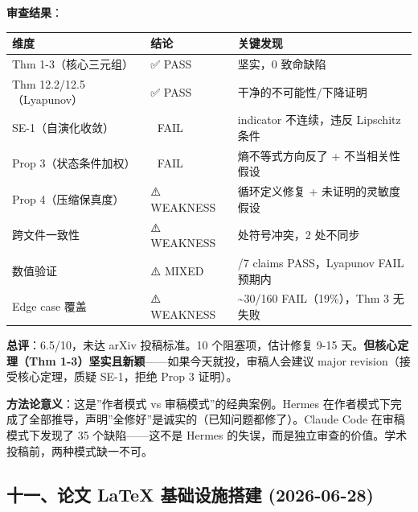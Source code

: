 \documentclass[
  12pt,
]{ctexart}
\begin{document}
\textbf{审查结果}：

\begin{longtable}[]{@{}
  >{\raggedright\arraybackslash}p{}
  >{\centering\arraybackslash}p{}
  >{\raggedright\arraybackslash}p{}@{}}
\toprule\noalign{}
\begin{minipage}[b]{\linewidth}\raggedright
维度
\end{minipage} & \begin{minipage}[b]{\linewidth}\centering
结论
\end{minipage} & \begin{minipage}[b]{\linewidth}\raggedright
关键发现
\end{minipage} \\
\midrule\noalign{}
\endhead
\bottomrule\noalign{}
\endlastfoot
Thm 1-3（核心三元组） & ✅ PASS & 坚实，0 致命缺陷 \\
Thm 12.2/12.5（Lyapunov） & ✅ PASS & 干净的不可能性/下降证明 \\
SE-1（自演化收敛） & 🔴 FAIL & indicator 不连续，违反 Lipschitz 条件 \\
Prop 3（状态条件加权） & 🔴 FAIL & 熵不等式方向反了 + 不当相关性假设 \\
Prop 4（压缩保真度） & ⚠️ WEAKNESS & 循环定义修复 +
未证明的灵敏度假设 \\
跨文件一致性 & ⚠️ WEAKNESS & 3 处符号冲突，2 处不同步 \\
数值验证 & ⚠️ MIXED & 5/7 claims PASS，Lyapunov FAIL 预期内 \\
Edge case 覆盖 & ⚠️ WEAKNESS & \textasciitilde30/160 FAIL（19\%），Thm 3
无失败 \\
\end{longtable}

\textbf{总评}：6.5/10，未达 arXiv 投稿标准。10 个阻塞项，估计修复 9-15
天。\textbf{但核心定理（Thm
1-3）坚实且新颖}------如果今天就投，审稿人会建议 major
revision（接受核心定理，质疑 SE-1，拒绝 Prop 3 证明）。

\textbf{方法论意义}：这是''作者模式 vs 审稿模式''的经典案例。Hermes
在作者模式下完成了全部推导，声明''全修好''是诚实的（已知问题都修了）。Claude
Code 在审稿模式下发现了 35 个缺陷------这不是 Hermes
的失误，而是独立审查的价值。学术投稿前，两种模式缺一不可。

\subsection{十一、论文 LaTeX 基础设施搭建
(2026-06-28)}\label{ux5341ux4e00ux8bbaux6587-latex-ux57faux7840ux8bbeux65bdux642dux5efa-2026-06-28}
\end{document}
